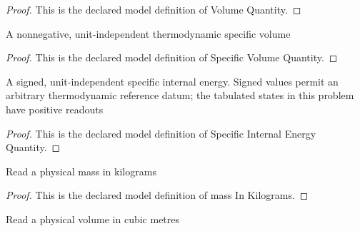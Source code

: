 \begin{proof}
  This is the declared model definition of Volume Quantity.
\end{proof}
\begin{definition}
  \label{def:physics:phyx-mini-0451:phyxminiproblems-problemphyxmini0451-specificvolumequantity}
  A nonnegative, unit-independent thermodynamic specific volume
\end{definition}
\begin{proof}
  This is the declared model definition of Specific Volume Quantity.
\end{proof}
\begin{definition}
  \label{def:physics:phyx-mini-0451:phyxminiproblems-problemphyxmini0451-specificinternalenergyquantity}
  A signed, unit-independent specific internal energy. Signed values permit an arbitrary thermodynamic reference datum; the tabulated states in this problem have positive readouts
\end{definition}
\begin{proof}
  This is the declared model definition of Specific Internal Energy Quantity.
\end{proof}
\begin{definition}
  \label{def:physics:phyx-mini-0451:phyxminiproblems-problemphyxmini0451-massinkilograms}
  Read a physical mass in kilograms
\end{definition}
\begin{proof}
  This is the declared model definition of mass In Kilograms.
\end{proof}
\begin{definition}
  \label{def:physics:phyx-mini-0451:phyxminiproblems-problemphyxmini0451-volumeincubicmetres}
  Read a physical volume in cubic metres
\end{definition}
